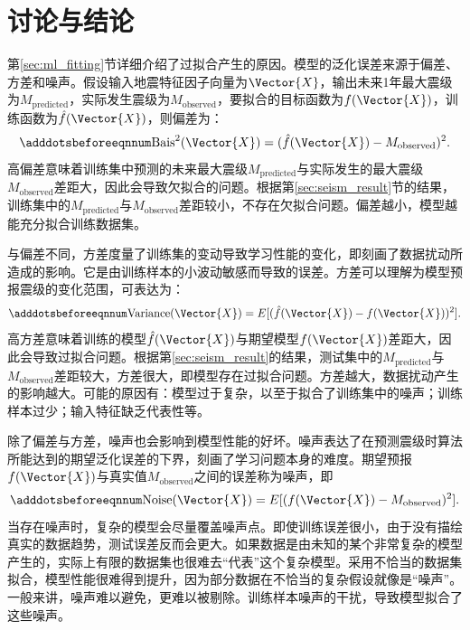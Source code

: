 \section{讨论与结论}\label{sec:seism_conclusion}

第\ref{sec:ml_fitting}节详细介绍了过拟合产生的原因。模型的泛化误差来源于偏差、方差和噪声。假设输入地震特征因子向量为$\Vector{X}$，输出未来1年最大震级为$M_{\text{predicted}}$，实际发生震级为$M_{\text{observed}}$，要拟合的目标函数为$f(\Vector{X})$，训练函数为$\hat{f}(\Vector{X})$，则偏差为：
\begin{equation}\adddotsbeforeeqnnum
  \label{eq:seism_bias}
  \text{Bais}^2(\Vector{X})=(\hat{f}(\Vector{X})-M_{\text{observed}})^2.
\end{equation}
高偏差意味着训练集中预测的未来最大震级$M_{\text{predicted}}$与实际发生的最大震级$M_{\text{observed}}$差距大，因此会导致欠拟合的问题。根据第\ref{sec:seism_result}节的结果，训练集中的$M_{\text{predicted}}$与$M_{\text{observed}}$差距较小，不存在欠拟合问题。偏差越小，模型越能充分拟合训练数据集。

与偏差不同，方差度量了训练集的变动导致学习性能的变化，即刻画了数据扰动所造成的影响。它是由训练样本的小波动敏感而导致的误差。方差可以理解为模型预报震级的变化范围，可表达为：
\begin{equation}\adddotsbeforeeqnnum
  \label{eq:seism_variance}
  \text{Variance}(\Vector{X})=E[(\hat{f}(\Vector{X})-f(\Vector{X}))^2].
\end{equation}
高方差意味着训练的模型$\hat{f}(\Vector{X})$与期望模型$f(\Vector{X})$差距大，因此会导致过拟合问题。根据第\ref{sec:seism_result}的结果，测试集中的$M_{\text{predicted}}$与$M_{\text{observed}}$差距较大，方差很大，即模型存在过拟合问题。方差越大，数据扰动产生的影响越大。可能的原因有：模型过于复杂，以至于拟合了训练集中的噪声；训练样本过少；输入特征缺乏代表性等。

除了偏差与方差，噪声也会影响到模型性能的好坏。噪声表达了在预测震级时算法所能达到的期望泛化误差的下界，刻画了学习问题本身的难度。期望预报$f(\Vector{X})$与真实值$M_{\text{observed}}$之间的误差称为噪声，即
\begin{equation}\adddotsbeforeeqnnum
  \label{eq:seism_noise}
  \text{Noise}(\Vector{X})=E[(f(\Vector{X})-M_{\text{observed}})^2].
\end{equation}
当存在噪声时，复杂的模型会尽量覆盖噪声点。即使训练误差很小，由于没有描绘真实的数据趋势，测试误差反而会更大。如果数据是由未知的某个非常复杂的模型产生的，实际上有限的数据集也很难去“代表”这个复杂模型。采用不恰当的数据集拟合，模型性能很难得到提升，因为部分数据在不恰当的复杂假设就像是“噪声”。一般来讲，噪声难以避免，更难以被剔除。训练样本噪声的干扰，导致模型拟合了这些噪声。

